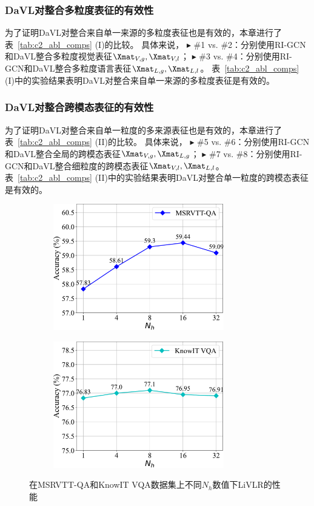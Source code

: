 \subsubsection{DaVL对整合多粒度表征的有效性}
为了证明DaVL对整合来自单一来源的多粒度表征也是有效的，本章进行了表~\ref{tab:c2_abl_comps} (I)的比较。
具体来说，
$\blacktriangleright$ \#1 vs. \#2：分别使用RI-GCN和DaVL整合多粒度视觉表征$\Xmat_{V,g}, \Xmat_{V, l}$；
$\blacktriangleright$ \#3 vs. \#4：分别使用RI-GCN和DaVL整合多粒度语言表征$\Xmat_{L, g}, \Xmat_{L, l}$。
表~\ref{tab:c2_abl_comps} (I)中的实验结果表明DaVL对整合来自单一来源的多粒度表征是有效的。




\subsubsection{DaVL对整合跨模态表征的有效性}
为了证明DaVL对整合来自单一粒度的多来源表征也是有效的，本章进行了表~\ref{tab:c2_abl_comps} (II)的比较。
具体来说，
$\blacktriangleright$ \#5 vs. \#6：分别使用RI-GCN和DaVL整合全局的跨模态表征$\Xmat_{V, g}, \Xmat_{L, g}$；
$\blacktriangleright$ \#7 vs. \#8：分别使用RI-GCN和DaVL整合细粒度的跨模态表征$\Xmat_{V, l}, \Xmat_{L, l}$。
表~\ref{tab:c2_abl_comps} (II)中的实验结果表明DaVL对整合单一粒度的跨模态表征是有效的。




\begin{figure}[!t]
\begin{subfigure}[b]{0.49\linewidth}
\centering
\includegraphics[height=5.5cm]{figure/c2_msrvtt_qa.pdf}
\end{subfigure}
\begin{subfigure}[b]{0.49\linewidth}
\centering
\includegraphics[height=5.5cm]{figure/c2_knowit_vqa.pdf}
\end{subfigure}
\caption{在MSRVTT-QA和KnowIT VQA数据集上不同$N_h$数值下LiVLR的性能}
\label{fig:c2_vis_param}
\end{figure}

